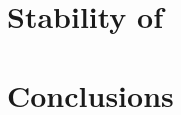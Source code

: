 \documentclass[preprint,number]{elsarticle}
\begin{document}
\section{Stability of \reqva}
    

\section{Conclusions}
    





    
\end{document}
